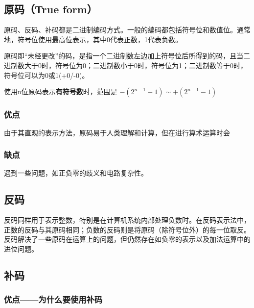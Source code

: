 \begin{issues}
\issueDraft
\end{issues}


\subsection{原码（True form）}

原码、反码、补码都是二进制编码方式。一般的编码都包括符号位和数值位。通常地，符号位使用最高位表示，其中0代表正数，1代表负数。

原码即“未经更改”的码，是指一个二进制数左边加上符号位后所得到的码，且当二进制数大于0时，符号位为0；二进制数小于0时，符号位为1；二进制数等于0时，符号位可以为0或1(+0/-0)。

使用n位原码表示\textbf{有符号数}时，范围是 $-(2^{n-1}-1)\sim +(2^{n-1}-1)$  

\subsubsection{优点}

由于其直观的表示方法，原码易于人类理解和计算，但在进行算术运算时会

\subsubsection{缺点}
遇到一些问题，如正负零的歧义和电路复杂性。

\subsection{反码}

反码同样用于表示整数，特别是在计算机系统内部处理负数时。在反码表示法中，正数的反码与其原码相同；负数的反码则是将原码（除符号位外）的每一位取反。反码解决了一些原码在运算上的问题，但仍然存在如负零的表示以及加法运算中的进位问题。

\subsection{补码}

\subsubsection{优点——为什么要使用补码}






